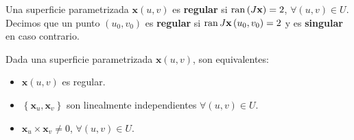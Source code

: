 \begin{definition}
	Una superficie parametrizada $\displaystyle \textbf{x} \left(u,v\right) $ es \textbf{regular} si $\displaystyle \operatorname{ran}\left(J \textbf{x} \right)=2 $, $\displaystyle \forall \left(u,v\right)\in U $. Decimos que un punto $\displaystyle \left(u_{0}, v_{0}\right) $ es \textbf{regular} si $\displaystyle \operatorname{ran} J \textbf{x} \left(u_{0}, v_{0}\right)=2 $ y es \textbf{singular} en caso contrario.
\end{definition}
\begin{observation}
	Dada una superficie parametrizada $\displaystyle \textbf{x} \left(u,v\right) $, son equivalentes:
	\begin{itemize}
	\item $\displaystyle \textbf{x} \left(u,v\right) $ es regular. 
	\item $\displaystyle \left\{ \textbf{x} _{u}, \textbf{x} _{v}\right\}  $ son linealmente independientes $\displaystyle \forall \left(u,v\right)\in U $.
	\item $\displaystyle \textbf{x} _{u} \times \textbf{x} _{v}\neq 0 $, $\displaystyle \forall \left(u,v\right)\in U $.
	\end{itemize}
\end{observation}

